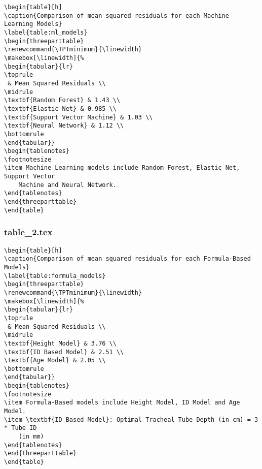 \documentclass[11pt]{article}
\begin{document}
\begin{Verbatim}[tabsize=4]
\begin{table}[h]
\caption{Comparison of mean squared residuals for each Machine Learning Models}
\label{table:ml_models}
\begin{threeparttable}
\renewcommand{\TPTminimum}{\linewidth}
\makebox[\linewidth]{%
\begin{tabular}{lr}
\toprule
 & Mean Squared Residuals \\
\midrule
\textbf{Random Forest} & 1.43 \\
\textbf{Elastic Net} & 0.985 \\
\textbf{Support Vector Machine} & 1.03 \\
\textbf{Neural Network} & 1.12 \\
\bottomrule
\end{tabular}}
\begin{tablenotes}
\footnotesize
\item Machine Learning models include Random Forest, Elastic Net, Support Vector
	Machine and Neural Network.
\end{tablenotes}
\end{threeparttable}
\end{table}

\end{Verbatim}

\subsubsection*{table\_2.tex}

\begin{Verbatim}[tabsize=4]
\begin{table}[h]
\caption{Comparison of mean squared residuals for each Formula-Based Models}
\label{table:formula_models}
\begin{threeparttable}
\renewcommand{\TPTminimum}{\linewidth}
\makebox[\linewidth]{%
\begin{tabular}{lr}
\toprule
 & Mean Squared Residuals \\
\midrule
\textbf{Height Model} & 3.76 \\
\textbf{ID Based Model} & 2.51 \\
\textbf{Age Model} & 2.05 \\
\bottomrule
\end{tabular}}
\begin{tablenotes}
\footnotesize
\item Formula-Based models include Height Model, ID Model and Age Model.
\item \textbf{ID Based Model}: Optimal Tracheal Tube Depth (in cm) = 3 * Tube ID
	(in mm)
\end{tablenotes}
\end{threeparttable}
\end{table}

\end{Verbatim}
\end{document}
